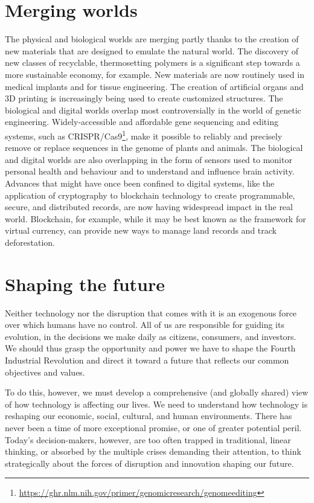     \section{Merging worlds}
    The physical and biological worlds are merging partly thanks to the creation of new materials that are designed to emulate the natural world. The discovery of new classes of recyclable, thermosetting polymers is a significant step towards a more sustainable economy, for example. New materials are now routinely used in medical implants and for tissue engineering. The creation of artificial organs and 3D printing is increasingly being used to create customized structures. The biological and digital worlds overlap most controversially in the world of genetic engineering. Widely-accessible and affordable gene sequencing and editing systems, such as CRISPR/Cas9\footnote{\url{https://ghr.nlm.nih.gov/primer/genomicresearch/genomeediting}}, make it possible to reliably and precisely remove or replace sequences in the genome of plants and animals. The biological and digital worlds are also overlapping in the form of sensors used to monitor personal health and behaviour and to understand and influence brain activity. Advances that might have once been confined to digital systems, like the application of cryptography to blockchain technology to create programmable, secure, and distributed records, are now having widespread impact in the real world. Blockchain, for example, while it may be best known as the framework for virtual currency, can provide new ways to manage land records and track deforestation.

    \section{Shaping the future}

    Neither technology nor the disruption that comes with it is an exogenous force over which humans have no control. All of us are responsible for guiding its evolution, in the decisions we make daily as citizens, consumers, and investors. We should thus grasp the opportunity and power we have to shape the Fourth Industrial Revolution and direct it toward a future that reflects our common objectives and values.\medskip
    
To do this, however, we must develop a comprehensive (and globally shared) view of how technology is affecting our lives. We need to understand how technology is reshaping our economic, social, cultural, and human environments. There has never been a time of more exceptional promise, or one of greater potential peril. Today's decision-makers, however, are too often trapped in traditional, linear thinking, or absorbed by the multiple crises demanding their attention, to think strategically about the forces of disruption and innovation shaping our future.\medskip
    
